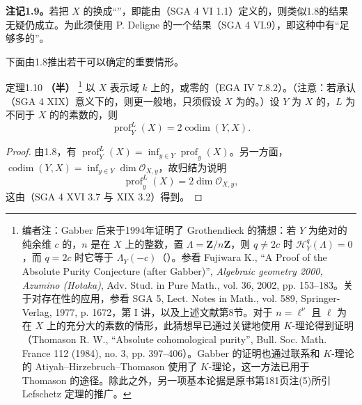 \textbf{注记1.9。}若把 $X$ 的换成“”，即能由（SGA 4 VI 1.1）定义的，则类似1.8的结果无疑仍成立。为此须使用 P. Deligne 的一个结果（SGA 4 VI.9），即这种中有“足够多的”。

下面由1.8推出若干可以确定的重要情形。
\begin{SGAresult}{定理}{1.10}
\textbf{（半）}
\footnote{编者注：Gabber 后来于1994年证明了 Grothendieck 的猜想：若 $Y$ 为绝对的纯余维 $c$ 的，$n$ 是在 $X$ 上的整数，置 $\Lambda=\mathbf Z/n\mathbf Z$，则 $q\ne2c$ 时 $\mathcal H_Y^q(\Lambda)=0$，而 $q=2c$ 时它等于 $\Lambda_Y(-c)$（）。参看 Fujiwara K., ``A Proof of the Absolute Purity Conjecture (after Gabber)'', \emph{Algebraic geometry 2000, Azumino (Hotaka)}, Adv. Stud. in Pure Math., vol. 36, 2002, pp. 153--183。关于对存在性的应用，参看 SGA 5, Lect. Notes in Math., vol. 589, Springer-Verlag, 1977, p. 1672，第 I 讲，以及上述文献第8节。对于 $n=\ell^\nu$ 且 $\ell$ 为在 $X$ 上的充分大的素数的情形，此猜想早已通过关键地使用 $K$-理论得到证明（Thomason R. W., ``Absolute cohomological purity'', Bull. Soc. Math. France 112 (1984), no. 3, pp. 397--406）。Gabber 的证明也通过联系和 $K$-理论的 Atiyah--Hirzebruch--Thomason 使用了 $K$-理论，这一方法已用于 Thomason 的途径。除此之外，另一项基本论据是原书第181页注(5)所引 Lefschetz 定理的推广。}
以 $X$ 表示域 $k$ 上的，或零的（EGA IV 7.8.2）。（注意：若承认（SGA 4 XIX）意义下的，则更一般地，只须假设 $X$ 为的。）设 $Y$ 为 $X$ 的，$L$ 为不同于 $X$ 的的素数的，则
\[\operatorname{prof}_Y^L(X)=2\operatorname{codim}(Y,X).\]
\end{SGAresult}
\begin{proof}
由1.8，有 $\operatorname{prof}_Y^L(X)=\inf_{y\in Y}\operatorname{prof}_y(X)$。另一方面，$\operatorname{codim}(Y,X)=\inf_{y\in Y}\dim\mathcal O_{X,y}$，故归结为说明
\[\operatorname{prof}_y^L(X)=2\dim\mathcal O_{X,y},\]
这由（SGA 4 XVI 3.7 与 XIX 3.2）得到。
\end{proof}
